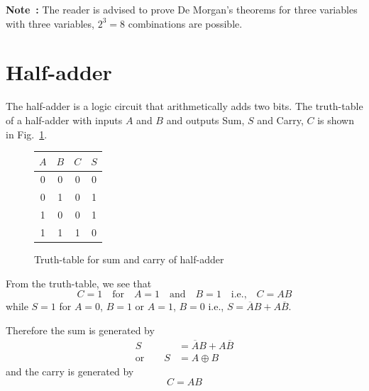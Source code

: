 \noindent
{\bf Note~:} 
The reader is advised to prove De Morgan's theorems for three variables with three variables, $2^{3}=8$ combinations are possible.

\section{Half-adder}\label{sec6.30}

The half-adder is a logic circuit that arithmetically adds two bits. The truth-table of a half-adder with inputs $A$ and $B$ and outputs Sum, $S$ and Carry, $C$ is shown in Fig.~\ref{fig6.27}.
\begin{figure}[H]
\centering
\tabcolsep=10pt
\renewcommand{\arraystretch}{2}
\begin{tabular}{|cc|cc|}
\hline
\boldmath$A$ & \boldmath$B$ & \boldmath$C$ & \boldmath$S$\\
\hline
0 & 0 & 0 & 0\\
0 & 1 & 0 & 1\\
1 & 0 & 0 & 1\\
1 & 1 & 1 & 0\\
\hline
\end{tabular}
\caption{Truth-table for sum and carry of half-adder}\label{fig6.27}
\end{figure}

From the truth-table, we see that
$$
C=1\text{~~ for~~ } A=1\text{~~ and~~ } B=1\text{~~ i.e.,~~ } C=AB
$$
while $S=1$ for $A=0$, $B=1$ or $A=1$, $B=0$ i.e., $S=\overline{A}B+A\overline{B}$.

\medskip

Therefore the sum is generated by
\begin{align}
S &= \overline{A}B+A\overline{B}\label{eq6.8}\\[5pt]
\text{or}\qquad S &= A\oplus B\label{eq6.9}
\end{align}
and the carry is generated by
\begin{equation}
C=AB\label{eq6.10}
\end{equation}

